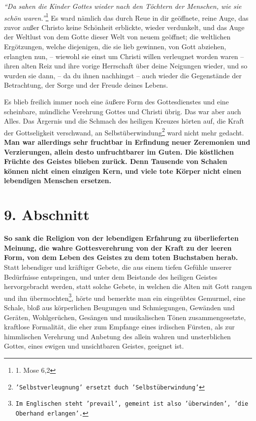 \textit{"`Da sahen die Kinder Gottes wieder nach den Töchtern der
Menschen, wie sie schön waren."'}\footnote{1. Mose 6,2}
Es ward nämlich das durch
Reue in dir geöffnete, reine Auge, das zuvor außer Christo keine Schönheit
erblickte, wieder verdunkelt, und das Auge der Weltlust von dem Gotte dieser
Welt von neuem geöffnet; die weltlichen Ergötzungen, welche diejenigen, die sie
lieb gewinnen, von Gott abziehen, erlangten nun, -- wiewohl sie einst um Christi
willen verleugnet worden waren -- ihren alten Reiz und ihre vorige Herrschaft
über deine Neigungen wieder, und so wurden sie dann, -- da du ihnen nachhingst
-- auch wieder die Gegenstände der Betrachtung, der Sorge und der Freude deines
Lebens.

\medskip

Es blieb freilich immer noch eine äußere Form des Gottesdienstes und eine
scheinbare, mündliche Verehrung Gottes und Christi übrig. Das war aber auch
Alles. Das Ärgernis und die Schmach des heiligen Kreuzes hörten auf, die Kraft
der Gottseligkeit verschwand, an
Selbstüberwindung\footnote{\texttt{'Selbstverleugnung' ersetzt duch
'Selbstüberwindung'}}
ward nicht mehr gedacht. \textbf{Man
war allerdings sehr fruchtbar in Erfindung neuer Zeremonien und Verzierungen,
allein desto unfruchtbarer im Guten. Die köstlichen Früchte des Geistes blieben
zurück. Denn Tausende von Schalen können nicht einen einzigen Kern, und viele
tote Körper nicht einen lebendigen Menschen ersetzen.}

\section{9. Abschnitt}  \label{kap2_ab9}

\label{ref:02_09_lebendige_erfahrung} \textbf{So sank die Religion von der
lebendigen Erfahrung zu überlieferten Meinung,
die wahre Gottesverehrung von der Kraft zu der leeren Form, von dem Leben des
Geistes zu dem toten Buchstaben herab.} Statt lebendiger und kräftiger Gebete,
die aus einem tiefen Gefühle unserer Bedürfnisse entspringen, und unter dem
Beistande des heiligen Geistes hervorgebracht werden, statt solche Gebete,
in welchen die Alten mit Gott rangen und ihn übermochten\footnote{\texttt{Im
Englischen steht 'prevail', gemeint ist also 'überwinden', 'die Oberhand
erlangen'.}},
hörte und bemerkte man ein
eingeübtes Gemurmel, eine Schale, bloß aus körperlichen Beugungen und
Schmiegungen, Gewänden und Geräten, Wohlgerüchen, Gesängen und musikalischen
Tönen zusammengesetzte, kraftlose Formalität, die eher zum Empfange eines
irdischen Fürsten, als zur himmlischen Verehrung und Anbetung des allein wahren
und unsterblichen Gottes, eines ewigen und unsichtbaren Geistes, geeignet ist.

